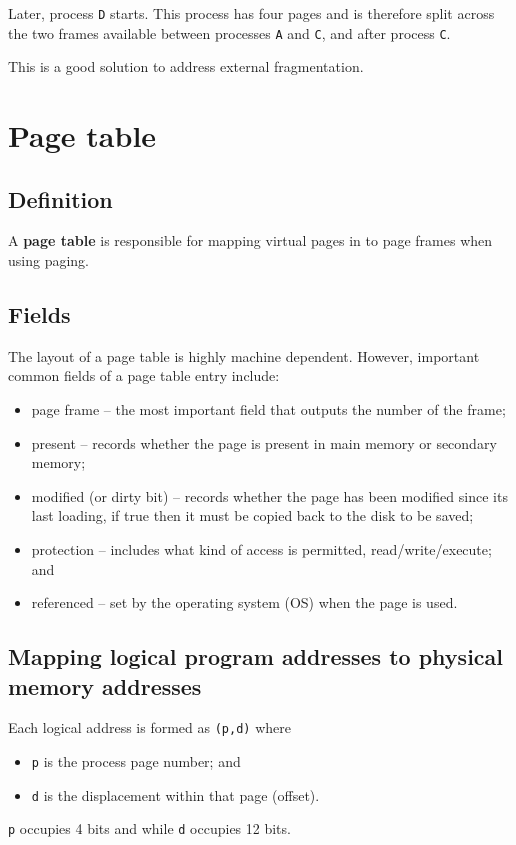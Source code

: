 \documentclass[a4paper]{systems-software}
\begin{document}
Later, process \texttt{D} starts. This process has four pages and is therefore split across the two frames available between processes \texttt{A} and \texttt{C}, and after process \texttt{C}.

This is a good solution to address external fragmentation.


\section*{Page table}

\subsection*{Definition}

A \textbf{page table} is responsible for mapping virtual pages in to page frames when using paging.


\subsection*{Fields}

The layout of a page table is highly machine dependent. However, important common fields of a page table entry include:
\begin{itemize}
	\item page frame -- the most important field that outputs the number of the frame;
	\item present -- records whether the page is present in main memory or secondary memory;
	\item modified (or dirty bit) -- records whether the page has been modified since its last loading, if true then it must be copied back to the disk to be saved;
	\item protection -- includes what kind of access is permitted, read/write/execute; and
	\item referenced -- set by the operating system (OS) when the page is used.
\end{itemize}


\subsection*{Mapping logical program addresses to physical memory addresses}

Each logical address is formed as \texttt{(p,d)} where
\begin{itemize}
	\item \texttt{p} is the process page number; and
	\item \texttt{d} is the displacement within that page (offset).
\end{itemize}
\texttt{p} occupies 4 bits and while \texttt{d} occupies 12 bits.
\end{document}
